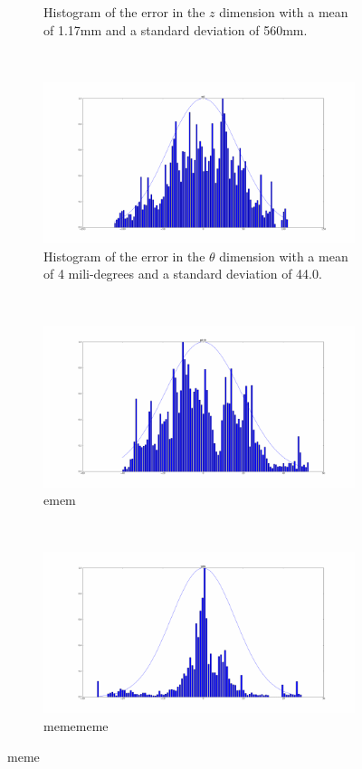 \begin{figure}
\begin{subfigure}{0.45\textwidth}
     \caption{Histogram of the error in the $z$ dimension with a mean of 1.17mm and a standard deviation of 560mm.}
  \label{fig:norm-z}
  \end{subfigure}
~
  \begin{subfigure}{0.45\textwidth}
     \includegraphics[width=\textwidth]{figures/chapter3/norm_roll.pdf}
     \caption{Histogram of the error in the $\theta$ dimension with a mean of 4 mili-degrees and a standard deviation of 44.0\degree.}
  \label{fig:norm-roll}
  \end{subfigure}
~
  \begin{subfigure}{0.45\textwidth}
     \includegraphics[width=\textwidth]{figures/chapter3/norm_pitch.pdf}
     \caption{emem}
  \label{fig:norm-pitch}
  \end{subfigure}
~
  \begin{subfigure}{0.45\textwidth}
     \includegraphics[width=\textwidth]{figures/chapter3/norm_yaw.pdf}
     \caption{memememe}
  \label{fig:norm-yaw}
  \end{subfigure}
  \caption{meme}
  \label{fig:err-norm}
\end{figure}

